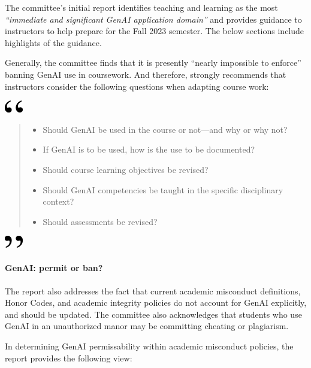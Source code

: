 \documentclass[
]{book}
\begin{document}
The committee's initial report identifies teaching and learning as the most \emph{``immediate and significant GenAI application domain''} and provides guidance to instructors to help prepare for the Fall 2023 semester. The below sections include highlights of the guidance.

Generally, the committee finds that it is presently ``nearly impossible to enforce'' banning GenAI use in coursework. And therefore, strongly recommends that instructors consider the following questions when adapting course work:

\includegraphics[width=0.3125in,height=0.20833in]{open.png}

\begin{quote}
\begin{itemize}
\item
  Should GenAI be used in the course or not---and why or why not?
\item
  If GenAI is to be used, how is the use to be documented?
\item
  Should course learning objectives be revised?
\item
  Should GenAI competencies be taught in the specific disciplinary context?
\item
  Should assessments be revised?
\end{itemize}
\end{quote}

\includegraphics[width=0.3125in,height=0.20833in]{close.png}

\hypertarget{genai-permit-or-ban}{%
\paragraph*{GenAI: permit or ban?}\label{genai-permit-or-ban}}

The report also addresses the fact that current academic misconduct definitions, Honor Codes, and academic integrity policies do not account for GenAI explicitly, and should be updated. The committee also acknowledges that students who use GenAI in an unauthorized manor may be committing cheating or plagiarism.

In determining GenAI permissability within academic misconduct policies, the report provides the following view:
\end{document}
